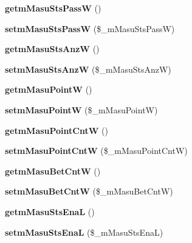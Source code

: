 \begin{DoxyCompactItemize}
{\bfseries getm\+Masu\+Sts\+PassW} ()
\item 
\mbox{\label{class_reversi_a76f39ccd1a55c6202985c310af21448d}} 
{\bfseries setm\+Masu\+Sts\+PassW} (\$\+\_\+m\+Masu\+Sts\+PassW)
\item 
\mbox{\label{class_reversi_a2e6dc6afd4e1f554a3a314e2638dc5aa}} 
{\bfseries getm\+Masu\+Sts\+AnzW} ()
\item 
\mbox{\label{class_reversi_a2fa42edd87104a0048ca0efecbb59708}} 
{\bfseries setm\+Masu\+Sts\+AnzW} (\$\+\_\+m\+Masu\+Sts\+AnzW)
\item 
\mbox{\label{class_reversi_ad8037037ea6c12c5f72bb1d1b5802d98}} 
{\bfseries getm\+Masu\+PointW} ()
\item 
\mbox{\label{class_reversi_a216f8ea81ed1a4d567bcbb9efe03b358}} 
{\bfseries setm\+Masu\+PointW} (\$\+\_\+m\+Masu\+PointW)
\item 
\mbox{\label{class_reversi_aa34fdde67253d92780a746ab64371956}} 
{\bfseries getm\+Masu\+Point\+CntW} ()
\item 
\mbox{\label{class_reversi_ab0ec543b38c99910b3f4b254c757b9b3}} 
{\bfseries setm\+Masu\+Point\+CntW} (\$\+\_\+m\+Masu\+Point\+CntW)
\item 
\mbox{\label{class_reversi_a513ff1271786bb02da384150ee891453}} 
{\bfseries getm\+Masu\+Bet\+CntW} ()
\item 
\mbox{\label{class_reversi_ae2b4be273c04556474b686db886cc97b}} 
{\bfseries setm\+Masu\+Bet\+CntW} (\$\+\_\+m\+Masu\+Bet\+CntW)
\item 
\mbox{\label{class_reversi_a6ce2cf2d07330bbca1ca6e48557fd777}} 
{\bfseries getm\+Masu\+Sts\+EnaL} ()
\item 
\mbox{\label{class_reversi_aa014d804f4eae9d38d7f807e362f1abc}} 
{\bfseries setm\+Masu\+Sts\+EnaL} (\$\+\_\+m\+Masu\+Sts\+EnaL)
\item 
\mbox{\label{class_reversi_a58f70e77c23b8a4460dc0065ac44fbcd}} 

\end{DoxyCompactItemize}
